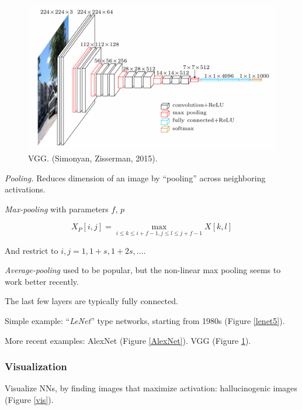 \documentclass[english]{article}
\begin{document}
\begin{figure}
  \centering
  \includegraphics[scale=0.3]{vgg.png}
    \caption{VGG. (Simonyan, Zisserman, 2015).}
    \label{VGG}
\end{figure}

\eenum 



\item \emph{Pooling.} Reduces dimension of an image by ``pooling'' across neighboring activations. 

\emph{Max-pooling} with parameters $f$, $p$

$$X_P[i,j]=\max_{i\le k \le  i+f-1 ,j \le l \le j+f-1} X[k,l]$$ 

And restrict to $i,j=1,1+s,1+2s,\ldots$.

\emph{Average-pooling} used to be popular, but the non-linear max pooling seems to work better recently. 

\item The last few layers are typically fully connected.

Simple example: ``\emph{LeNet}'' type networks, starting from 1980s (Figure \ref{lenet5}). 

More recent examples: AlexNet (Figure \ref{AlexNet}). VGG (Figure \ref{VGG}). 

\eenum
\subsubsection{Visualization}
\benum

\item Visualize NNs, by finding images that maximize activation: hallucinogenic images (Figure \ref{vis}).
\end{document}
